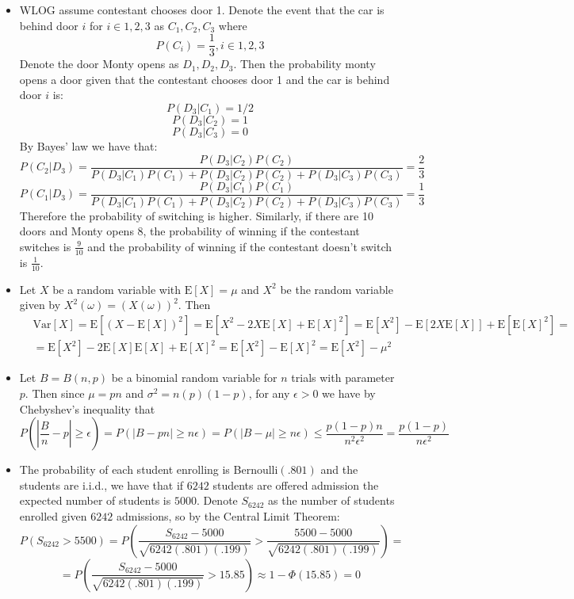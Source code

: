 \documentclass[12pt]{article}
\newcommand{\E}{\mathrm{E}}
\newcommand{\Var} {\mathrm{Var}}
\newenvironment{problem}[2][Problem]{\begin{trivlist}
\item[\hskip \labelsep {\bfseries #1}\hskip \labelsep {\bfseries #2}]}{\end{trivlist}}
\begin{document}
\begin{problem}{1.}
\begin{itemize}
\item[(3.12)] WLOG assume contestant chooses door 1. Denote the event that  the car is behind door $i$ for  $i \in 1,2,3$ as $C_1, C_2, C_3$ where $$ P(C_i) = \frac{1}{3}, i \in 1,2,3$$  Denote the door Monty opens as $D_1, D_2, D_3$. Then the probability monty opens a door given that the contestant chooses door 1 and the car is behind door $i$ is:
$$P(D_3 |C_1) = 1/2$$
$$P(D_3 |C_2) = 1$$
$$P(D_3 |C_3) = 0$$
By Bayes' law we have that:
$$P(C_2|D_3) = \frac{P(D_3|C_2)P(C_2)}{P(D_3|C_1)P(C_1)+ P(D_3|C_2)P(C_2)+ P(D_3|C_3)P(C_3)} = \frac{2}{3}$$
$$P(C_1|D_3) = \frac{P(D_3|C_1)P(C_1)}{P(D_3|C_1)P(C_1)+ P(D_3|C_2)P(C_2)+ P(D_3|C_3)P(C_3)} = \frac{1}{3}$$
Therefore the probability of switching is higher. Similarly, if there are 10 doors and Monty opens 8, the probability of winning if the contestant switches is $\frac{9}{10}$ and the probability of winning if the contestant doesn't switch is $\frac{1}{10}$.
\item[(3.16)] Let $X$ be a random variable with $\E[X] = \mu$ and $X^2$ be the random variable given by $X^2(\omega) = (X(\omega))^2$. Then 
\begin{equation*}
\begin{aligned}
& \Var[X] = \E[(X-\E[X])^2] = \E[X^2 - 2X\E[X] + \E[X]^2] = \E[X^2] - \E[2X\E[X]] + \E[\E[X]^2]  =\\
& = \E[X^2] - 2\E[X]\E[X] + \E[X]^2 = \E[X^2]-\E[X]^2 = \E[X^2]-\mu^2
\end{aligned}
\end{equation*}

\item[(3.33)] Let $B = B(n,p)$ be a binomial random variable for $n$ trials with parameter $p$. Then since $\mu = pn$ and $\sigma^2 = n(p)(1-p)$, for any $\epsilon > 0$ we have by Chebyshev's inequality that 
$$P(|\frac{B}{n}-p| \geq \epsilon) = P(|B-pn| \geq n\epsilon) = P(|B-\mu| \geq n\epsilon) \leq \frac{p(1-p)n}{n^2\epsilon^2} =  \frac{p(1-p)}{n\epsilon^2}$$

\item[(3.36)] The probability of each student enrolling is Bernoulli$(.801)$ and the students are i.i.d., we have that if $6242$ students are offered admission the expected number of students is $5000$. Denote $S_{6242}$ as the number of students enrolled given $6242$ admissions, so by the Central Limit Theorem:
$$ P(S_{6242} > 5500) = P(\frac{S_{6242} - 5000}{\sqrt{6242(.801)(.199)}} > \frac{5500 - 5000}{\sqrt{6242(.801)(.199)}} ) =$$ $$= P(\frac{S_{6242} - 5000}{\sqrt{6242(.801)(.199)}} > 15.85) \approx 1- \Phi(15.85) =  0$$

\end{itemize}
\end{problem}
\end{document}
